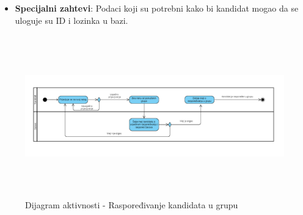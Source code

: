 \begin{itemize}
  \item \textbf{Specijalni zahtevi}:\newline
      Podaci koji su potrebni kako bi kandidat mogao da se uloguje su ID i lozinka u bazi.
\end{itemize}

  

\begin{figure}[H]
  \begin{center}
      \includegraphics[width=140mm, height=70mm]{Diagrams/dijagram_aktivnosti_grupe.png}
  \end{center}
  \caption {Dijagram aktivnosti - Raspoređivanje kandidata u grupu}
  \label{activity_grupe}

\end{figure}